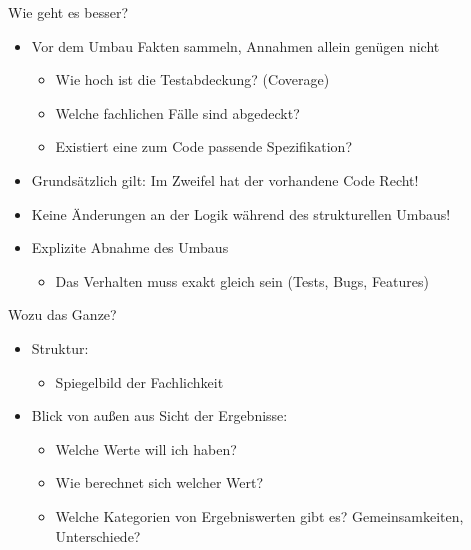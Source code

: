 \begin{frame}[fragile]{Wie geht es besser?}
\begin{itemize}
\item Vor dem Umbau Fakten sammeln, Annahmen allein genügen nicht
\begin{itemize}
\item Wie hoch ist die Testabdeckung? (Coverage)
\item Welche fachlichen Fälle sind abgedeckt?
\item Existiert eine zum Code passende Spezifikation?
\end{itemize}

\item Grundsätzlich gilt: Im Zweifel hat der vorhandene Code Recht!

\item Keine Änderungen an der Logik während des strukturellen Umbaus!

\item Explizite Abnahme des Umbaus
\begin{itemize}
\item Das Verhalten muss exakt gleich sein (Tests, Bugs, Features)
\end{itemize}

\end{itemize}
\end{frame}



\begin{frame}[fragile]{Wozu das Ganze?}
\begin{itemize}
\item Struktur:
\begin{itemize}
\item Spiegelbild der Fachlichkeit
\end{itemize}
\item Blick von außen aus Sicht der Ergebnisse:
\begin{itemize}
\item Welche Werte will ich haben?
\item Wie berechnet sich welcher Wert?
\item Welche Kategorien von Ergebniswerten gibt es? Gemeinsamkeiten, Unterschiede?
\end{itemize}
\end{itemize}
\end{frame}


